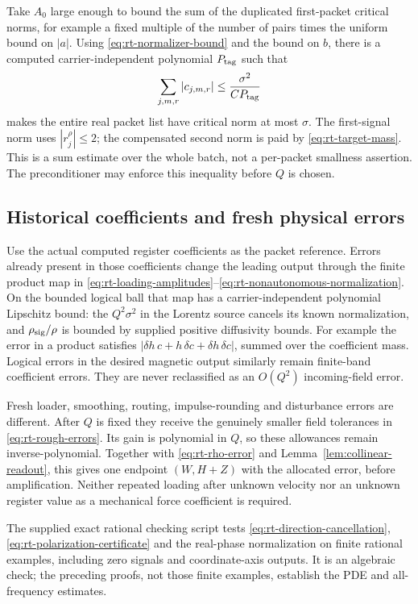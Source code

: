 \documentclass[11pt,a4paper]{amsart}
\theoremstyle{definition}
\theoremstyle{remark}
\numberwithin{equation}{section}
\begin{document}
Take $A_0$ large enough to bound the sum of the duplicated first-packet
critical norms, for example a fixed multiple of the number of pairs times
the uniform bound on $|a|$.  Using
\eqref{eq:rt-normalizer-bound} and the bound on $b$, there is a computed
carrier-independent polynomial $P_{\rm tag}$ such that
\begin{equation}\label{eq:rt-target-mass}
 \sum_{j,m,r}|c_{j,m,r}|\le\frac{\sigma^2}{C P_{\rm tag}}
\end{equation}
makes the entire real packet list have critical norm at most $\sigma$.
The first-signal norm uses $|r_j^\rho|\le2$; the compensated
second norm is paid by \eqref{eq:rt-target-mass}.  This is a sum estimate
over the whole batch, not a per-packet smallness assertion.  The
preconditioner may enforce this inequality before $Q$ is chosen.

\subsection{Historical coefficients and fresh physical errors}
Use the actual computed register coefficients as the packet reference.
Errors already present in those coefficients change the leading output
through the finite product map in
\eqref{eq:rt-loading-amplitudes}--\eqref{eq:rt-nonautonomous-normalization}.
On the bounded logical ball that map has a carrier-independent polynomial
Lipschitz bound: the $Q^2\sigma^2$ in the Lorentz source cancels its known
normalization, and $\rho_{\rm sig}/\rho$ is bounded by supplied positive
diffusivity bounds.  For example the error in a product satisfies
$|\delta h\,c+h\,\delta c+\delta h\,\delta c|$, summed over the coefficient
mass.  Logical errors in the desired magnetic output similarly remain
finite-band coefficient errors.  They are never reclassified as an
$O(Q^2)$ incoming-field error.

Fresh loader, smoothing, routing, impulse-rounding and disturbance errors
are different.  After $Q$ is fixed they receive the genuinely smaller
field tolerances in \eqref{eq:rt-rough-errors}.  Its gain is polynomial
in $Q$, so these allowances remain inverse-polynomial.  Together with
\eqref{eq:rt-rho-error} and Lemma~\ref{lem:collinear-readout}, this gives
one endpoint $(W,H+Z)$ with the allocated error, before amplification.
Neither repeated loading after unknown velocity nor an unknown register
value as a mechanical force coefficient is required.

The supplied exact rational checking script tests
\eqref{eq:rt-direction-cancellation},
\eqref{eq:rt-polarization-certificate} and the real-phase normalization on
finite rational examples, including zero signals and coordinate-axis
outputs.  It is an algebraic check; the preceding proofs, not those
finite examples, establish the PDE and all-frequency estimates.
\end{document}
